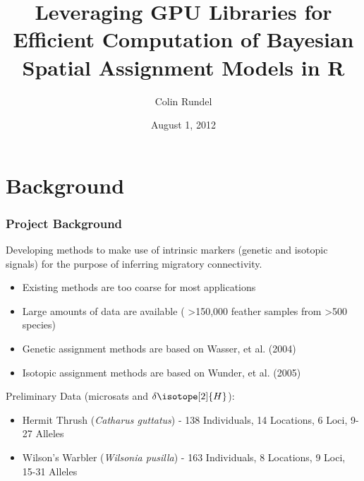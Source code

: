 \documentclass[slidestop,mathserif]{beamer}
\title[JSM 2012]{Leveraging GPU Libraries for Efficient Computation of Bayesian Spatial Assignment Models in R}
\author{Colin Rundel}
\date{August 1, 2012}
\institute[UCLA / Duke]{University of California, Los Angeles / Duke University}
\begin{document}
\begin{frame}[plain]
\titlepage
\end{frame}


\section{Background}
\addtocounter{framenumber}{-1} 


\begin{frame}
\frametitle{Project Background}

Developing methods to make use of intrinsic markers (genetic and isotopic signals) for the purpose of inferring migratory connectivity.

\begin{itemize}
\item Existing methods are too coarse for most applications
\item Large amounts of data are available ( \textgreater{}150,000 feather samples from \textgreater{}500 species)
\item Genetic assignment methods are based on Wasser, et al. (2004)
\item Isotopic assignment methods are based on Wunder, et al. (2005)
\end{itemize}

\vspace{3mm}

Preliminary Data (microsats and $\delta \isotope[2]{H}$):
\begin{itemize}
\item Hermit Thrush (\textit{Catharus guttatus}) - 138 Individuals, 14 Locations, 6 Loci, 9-27 Alleles
\item Wilson's Warbler (\textit{Wilsonia pusilla}) - 163 Individuals, 8 Locations, 9 Loci, 15-31 Alleles
\end{itemize}


\end{frame}


\end{document}
